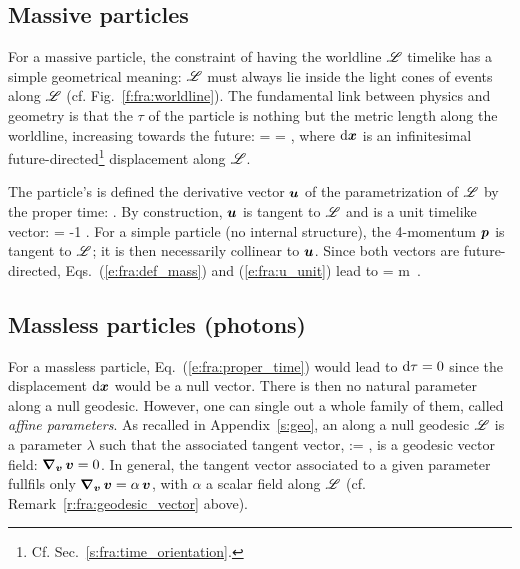 \subsection{Massive particles} \label{s:fra:massive_part}

For a massive particle, the constraint of having the worldline $\mathscr{L}$ timelike
has a simple geometrical meaning: $\mathscr{L}$ must
always lie inside the light cones of events along $\mathscr{L}$ (cf. Fig.~\ref{f:fra:worldline}).
The fundamental link between physics and geometry is that the
 $\tau$ of the particle
is nothing but the metric length along the worldline, increasing towards the future:
\be \label{e:fra:proper_time}
    \D\tau =  =  ,
\ee
where $\mathrm{d}\bm{x}$ is an infinitesimal future-directed\footnote{Cf. Sec.~\ref{s:fra:time_orientation}.} displacement
along $\mathscr{L}$.

The particle's  is defined the
derivative vector $\bm{u}$ of the parametrization of
$\mathscr{L}$ by the proper time:
\be \label{e:fra:def_u}
    .
\ee
By construction, $\bm{u}$ is tangent to $\mathscr{L}$ and is a unit timelike vector:
\be \label{e:fra:u_unit}
    \cdot{} = -1 .
\ee
For a simple particle (no internal structure),
the 4-momentum $\bm{p}$ is tangent to $\mathscr{L}$; it is then necessarily
collinear to $\bm{u}$. Since both vectors are future-directed,
Eqs.~(\ref{e:fra:def_mass}) and (\ref{e:fra:u_unit}) lead to
\be \label{e:fra:p_m_u}
     = m\,  .
\ee

\subsection{Massless particles (photons)}

For a massless particle, Eq.~(\ref{e:fra:proper_time}) would lead to $\mathrm{d}\tau=0$
since the displacement $\mathrm{d}\bm{x}$ would be a null vector. There is then no natural parameter
along a null geodesic. However, one can single out a whole family of them,
called \emph{affine parameters}.
As recalled in Appendix~\ref{s:geo},
an 
along a null geodesic $\mathscr{L}$ is a parameter $\lambda$ such that
the associated tangent vector,
\be
     :=  ,
\ee
is a geodesic vector field: $\bm{\nabla}_{\bm{v}} \, \bm{v} = 0$. In general,
the tangent vector associated to a given parameter fullfils only
$\bm{\nabla}_{\bm{v}} \, \bm{v} = \alpha \, \bm{v}$, with $\alpha$ a scalar field
along $\mathscr{L}$ (cf. Remark~\ref{r:fra:geodesic_vector} above).

